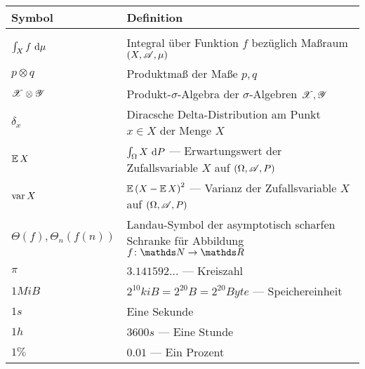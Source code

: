 \begin{table}[H]
	\begin{tabularx}{\textwidth}{p{}p{}}
		\hline
		\textbf{Symbol} & \textbf{Definition} \\
		\hline
		\hline \\



		$\int_{X}^{} f\ \mathrm{d} \mu$ & Integral über Funktion $f$ bezüglich Maßraum $(X,\mathscr{A},\mu)$ \\

		$p\otimes q$ & Produktmaß der Maße $p,q$ \\

		$\mathscr{X}\otimes\mathscr{Y}$ & Produkt-$\sigma$-Algebra der $\sigma$-Algebren $\mathscr{X},\mathscr{Y}$ \\

		$\delta_x$ & Diracsche Delta-Distribution am Punkt $x\in X$ der Menge $X$ \\

		$\operatorname{\mathbb{E}} X$ & $\int_{\Omega}^{} X\ \mathrm{d} P$ --- Erwartungswert der Zufallsvariable $X$ auf $(\Omega,\mathscr{A},P)$\\

		$\operatorname{var} X$ & $\operatorname{\mathbb{E}}\left( X-\operatorname{\mathbb{E}} X \right)^2$ --- Varianz der Zufallsvariable $X$ auf $(\Omega,\mathscr{A},P)$\\

		$\Theta(f),\Theta_n(f(n))$ & Landau-Symbol der asymptotisch scharfen Schranke für Abbildung $\func{f}{\SN}{\SR}$ \\

		$\pi$ & $3.141592\ldots$ --- Kreiszahl \\

		$1\unit{MiB}$ & $2^{10}\unit{kiB} = 2^{20}\unit{B} = 2^{20}\unit{Byte}$ --- Speichereinheit \\

		$1\unit{s}$ & Eine Sekunde \\

		$1\unit{h}$ & $3600\unit{s}$ --- Eine Stunde \\

		$1\unit{\%}$ & $0.01$ --- Ein Prozent

		\\
		\hline
	\end{tabularx}
\end{table}
